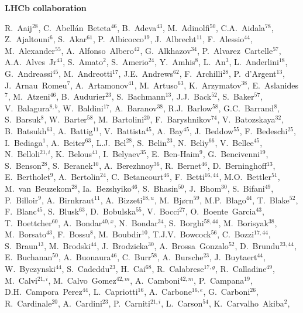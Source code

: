\centerline{\large\bf LHCb collaboration}
\begin{flushleft}
\small
R.~Aaij$^{28}$,
C.~Abell{\'a}n~Beteta$^{46}$,
B.~Adeva$^{43}$,
M.~Adinolfi$^{50}$,
C.A.~Aidala$^{78}$,
Z.~Ajaltouni$^{6}$,
S.~Akar$^{61}$,
P.~Albicocco$^{19}$,
J.~Albrecht$^{11}$,
F.~Alessio$^{44}$,
M.~Alexander$^{55}$,
A.~Alfonso~Albero$^{42}$,
G.~Alkhazov$^{34}$,
P.~Alvarez~Cartelle$^{57}$,
A.A.~Alves~Jr$^{43}$,
S.~Amato$^{2}$,
S.~Amerio$^{24}$,
Y.~Amhis$^{8}$,
L.~An$^{3}$,
L.~Anderlini$^{18}$,
G.~Andreassi$^{45}$,
M.~Andreotti$^{17}$,
J.E.~Andrews$^{62}$,
F.~Archilli$^{28}$,
P.~d'Argent$^{13}$,
J.~Arnau~Romeu$^{7}$,
A.~Artamonov$^{41}$,
M.~Artuso$^{63}$,
K.~Arzymatov$^{38}$,
E.~Aslanides$^{7}$,
M.~Atzeni$^{46}$,
B.~Audurier$^{23}$,
S.~Bachmann$^{13}$,
J.J.~Back$^{52}$,
S.~Baker$^{57}$,
V.~Balagura$^{8,b}$,
W.~Baldini$^{17}$,
A.~Baranov$^{38}$,
R.J.~Barlow$^{58}$,
G.C.~Barrand$^{8}$,
S.~Barsuk$^{8}$,
W.~Barter$^{58}$,
M.~Bartolini$^{20}$,
F.~Baryshnikov$^{74}$,
V.~Batozskaya$^{32}$,
B.~Batsukh$^{63}$,
A.~Battig$^{11}$,
V.~Battista$^{45}$,
A.~Bay$^{45}$,
J.~Beddow$^{55}$,
F.~Bedeschi$^{25}$,
I.~Bediaga$^{1}$,
A.~Beiter$^{63}$,
L.J.~Bel$^{28}$,
S.~Belin$^{23}$,
N.~Beliy$^{66}$,
V.~Bellee$^{45}$,
N.~Belloli$^{21,i}$,
K.~Belous$^{41}$,
I.~Belyaev$^{35}$,
E.~Ben-Haim$^{9}$,
G.~Bencivenni$^{19}$,
S.~Benson$^{28}$,
S.~Beranek$^{10}$,
A.~Berezhnoy$^{36}$,
R.~Bernet$^{46}$,
D.~Berninghoff$^{13}$,
E.~Bertholet$^{9}$,
A.~Bertolin$^{24}$,
C.~Betancourt$^{46}$,
F.~Betti$^{16,44}$,
M.O.~Bettler$^{51}$,
M.~van~Beuzekom$^{28}$,
Ia.~Bezshyiko$^{46}$,
S.~Bhasin$^{50}$,
J.~Bhom$^{30}$,
S.~Bifani$^{49}$,
P.~Billoir$^{9}$,
A.~Birnkraut$^{11}$,
A.~Bizzeti$^{18,u}$,
M.~Bj{\o}rn$^{59}$,
M.P.~Blago$^{44}$,
T.~Blake$^{52}$,
F.~Blanc$^{45}$,
S.~Blusk$^{63}$,
D.~Bobulska$^{55}$,
V.~Bocci$^{27}$,
O.~Boente~Garcia$^{43}$,
T.~Boettcher$^{60}$,
A.~Bondar$^{40,x}$,
N.~Bondar$^{34}$,
S.~Borghi$^{58,44}$,
M.~Borisyak$^{38}$,
M.~Borsato$^{43}$,
F.~Bossu$^{8}$,
M.~Boubdir$^{10}$,
T.J.V.~Bowcock$^{56}$,
C.~Bozzi$^{17,44}$,
S.~Braun$^{13}$,
M.~Brodski$^{44}$,
J.~Brodzicka$^{30}$,
A.~Brossa~Gonzalo$^{52}$,
D.~Brundu$^{23,44}$,
E.~Buchanan$^{50}$,
A.~Buonaura$^{46}$,
C.~Burr$^{58}$,
A.~Bursche$^{23}$,
J.~Buytaert$^{44}$,
W.~Byczynski$^{44}$,
S.~Cadeddu$^{23}$,
H.~Cai$^{68}$,
R.~Calabrese$^{17,g}$,
R.~Calladine$^{49}$,
M.~Calvi$^{21,i}$,
M.~Calvo~Gomez$^{42,m}$,
A.~Camboni$^{42,m}$,
P.~Campana$^{19}$,
D.H.~Campora~Perez$^{44}$,
L.~Capriotti$^{16}$,
A.~Carbone$^{16,e}$,
G.~Carboni$^{26}$,
R.~Cardinale$^{20}$,
A.~Cardini$^{23}$,
P.~Carniti$^{21,i}$,
L.~Carson$^{54}$,
K.~Carvalho~Akiba$^{2}$,

\end{flushleft}
